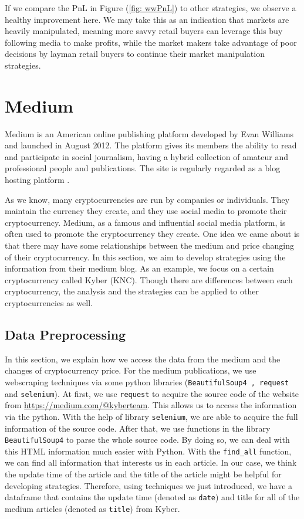 \documentclass[twoside]{report}
\newcommand{\code}{\texttt}
\begin{document}
\begin{spacing}{1}
If we compare the PnL in Figure (\ref{fig: wwPnL}) to other strategies, we observe a healthy improvement here. We may take this as an indication that markets are heavily manipulated, meaning more savvy retail buyers can leverage this buy following media to make profits, while the market makers take advantage of poor decisions by layman retail buyers to continue their market manipulation strategies.

\section{Medium}\label{sec:medium}
Medium is an American online publishing platform developed by Evan Williams and launched in August 2012. The platform gives its members the ability to read and participate in social journalism, having a hybrid collection of amateur and professional people and publications. The site is regularly regarded as a blog hosting platform \cite{streitfeld2017internet}.




As we know, many cryptocurrencies are run by companies or individuals. They maintain the currency they create, and they use social media to promote their cryptocurrency. Medium, as a famous and influential social media platform, is often used to promote the cryptocurrency they create. One idea we came about is that there may have some relationships between the medium and price changing of their cryptocurrency. In this section, we aim to develop strategies using the information from their medium blog. As an example, we focus on a certain cryptocurrency called Kyber (KNC). Though there are differences between each cryptocurrency, the analysis and the strategies can be applied to other cryptocurrencies as well. 



\subsection{Data Preprocessing}
In this section, we explain how we access the data from the medium and the changes of cryptocurrency price. For the medium publications, we use webscraping techniques via some python libraries (\code{BeautifulSoup4 , request} and \code{selenium}). At first, we use \code{request} to acquire the source code of the website from \url{https://medium.com/@kyberteam}. This allows us to access the information via the python.  With the help of library \code{selenium}, we are able to acquire the full information of the source code. After that, we use functions in the library \code{BeautifulSoup4} to parse the whole source code. By doing so, we can deal with this HTML information much easier with Python. With the \code{find\_all} function, we can find all information that interests us in each article. In our case, we think the update time of the article and the title of the article might be helpful for developing strategies. Therefore, using techniques we just introduced, we have a dataframe that contains the update time (denoted as \code{date}) and title for all of the medium articles (denoted as \code{title}) from Kyber.


\end{spacing}
\end{document}
